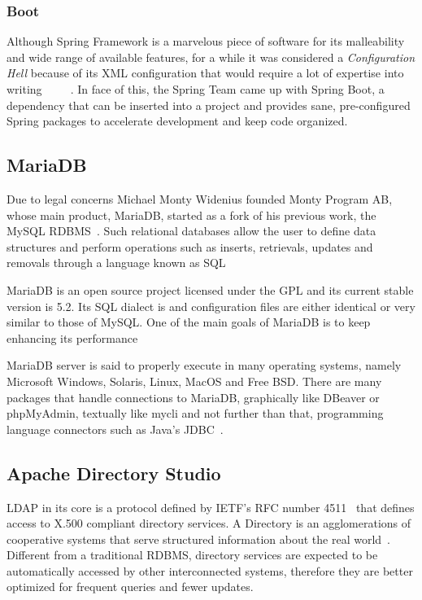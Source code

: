\subsubsection{Boot}
Although Spring Framework is a marvelous piece of software for its malleability and wide range of available features, for a while it was considered a \textit{Configuration Hell} because of its \gls{XML} configuration that would require a lot of expertise into writing~\cite{xmlhell1}~\cite{xmlhell2}~\cite{xmlhell3}~\cite{xmlhell4}~\cite{xmlhell5}. In face of this, the Spring Team came up with Spring Boot, a dependency that can be inserted into a project and provides sane, pre-configured Spring packages to accelerate development and keep code organized.

\subsection{MariaDB}
Due to legal concerns Michael Monty Widenius founded Monty Program AB, whose main product, MariaDB, started as a fork of his previous work, the MySQL \gls{RDBMS}~\cite{MAVRO:2014}. Such relational databases allow the user to define data structures and perform operations such as inserts, retrievals, updates and removals through a language known as \gls{SQL}

MariaDB is an open source project licensed under the \gls{GPL} and its current stable version is 5.2. Its \gls{SQL} dialect is and configuration files are either identical or very similar to those of MySQL. One of the main goals of MariaDB is to keep enhancing its performance~\cite{BARTHOLOMEW:2012}

MariaDB server is said to properly execute in many operating systems, namely Microsoft Windows, Solaris, Linux, MacOS and Free BSD. There are many packages that handle connections to MariaDB, graphically like DBeaver or phpMyAdmin, textually like mycli and not further than that, programming language connectors such as Java's \gls{JDBC}~\cite{MARIADB:2019}.

\subsection{Apache Directory Studio}\label{ads}
\gls{LDAP} in its core is a protocol defined by \gls{IETF}'s \gls{RFC} number 4511~\cite{ldaprfc} that defines access to X.500 compliant directory services. A Directory is an agglomerations of cooperative systems that serve structured information about the real world~\cite{x500}. Different from a traditional \gls{RDBMS}, directory services are expected to be automatically accessed by other interconnected systems, therefore they are better optimized for frequent queries and fewer updates.

